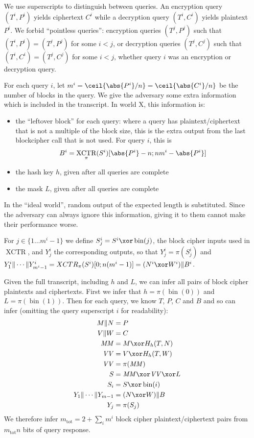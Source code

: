 \documentclass[letterpaper,11pt]{article}
\newcommand*{\Concat}{\Vert}
\newcommand*{\MM}{\mathit{MM}}
\newcommand*{\mtot}{m_{\mathrm{tot}}}
\newcommand*{\VV}{\mathit{VV}}
\DeclareMathOperator{\fromint}{bin}
\DeclareMathOperator{\XCTR}{XCTR}
\begin{document}
We use superscripts to distinguish between queries.
An encryption query \((T^i, P^i)\) yields ciphertext \(C^i\)
while a decryption query \((T^i, C^i)\)
yields plaintext \(P^i\).
We forbid ``pointless queries'':
encryption queries \((T^j, P^j)\)
such that \((T^i, P^i) = (T^j, P^j)\) for some \(i < j\), 
or decryption queries \((T^j, C^j)\)
such that \((T^i, C^i) = (T^j, C^j)\) for some \(i < j\),
whether query \(i\) was an encryption or decryption query.

For each query \(i\), let \(m^i = \ceil{\abs{P^i}/n} = \ceil{\abs{C^i}/n}\)
be the number of blocks in the query.
We give the adversary some 
extra information
which is included in the transcript.
In world X, this information is:
\begin{itemize}
    \item the ``leftover block'' for each query:
    where a query has plaintext/ciphertext
    that is not a multiple of the block size,
    this is the extra output from the last
    blockcipher call that is not used.
    For query \(i\), this is 
    \begin{displaymath}
        B^i = \XCTR_\pi(S^i)[\abs{P^i} - n; nm^i-\abs{P^i}]
    \end{displaymath}
    \item the hash key \(h\), given after all queries are complete
    \item the mask \(L\), given after all queries are complete
\end{itemize}
In the ``ideal world'', random output of the expected
length is substituted. Since the adversary can always ignore
this information, giving it to them cannot make their performance worse.

For \(j \in \{1 \ldots m^i-1\}\) we define \(S_j^i = S^i \xor \fromint(j)\),
the block cipher inputs used in \(\XCTR\), and \(Y_j^i\) the corresponding
outputs, so that \(Y_j^i = \pi(S_j^i)\) and 
\(Y_1^i \Concat \cdots \Concat Y_{m^i-1}^i = XCTR_\pi(S^i)[0;n(m^i -1)] 
= (N^i \xor W^i) \Concat B^i\).

Given the full transcript, including \(h\) and \(L\),
we can infer all pairs of block cipher plaintexts and ciphertexts.
First we infer that \(h = \pi(\fromint(0))\) and \(L = \pi(\fromint(1))\).
Then for each query, we know \(T\), \(P\), \(C\) and \(B\)
and so can infer
(omitting the query superscript \(i\) for readability):
\begin{align*}
    M \Concat N &= P \\
    V \Concat W &= C \\
    \MM &= M \xor H_h(T, N)\\
    \VV &= V \xor H_h(T, W)\\
    \VV &= \pi(\MM)\\
    S &= \MM \xor \VV \xor L\\ 
    S_i &= S \xor \fromint(i)\\
    Y_1 \Concat \cdots \Concat Y_{m-1} &= (N \xor W) \Concat B \\
    Y_j &= \pi(S_j) \\
\end{align*}
We therefore infer \(\mtot = 2 + \sum_i m^i \) block cipher
plaintext/ciphertext pairs from \(\mtot n\) bits of query response.
\end{document}
